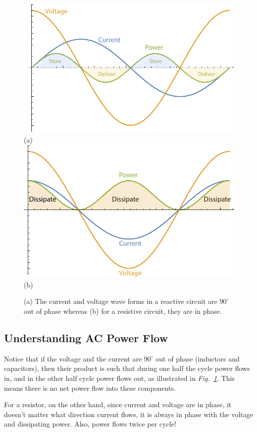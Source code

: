 \begin{figure}[t]
\centering
\includegraphics[width=.65\columnwidth]{cap_power}\\
(a)\\
\includegraphics[width=.625\columnwidth]{res_power}\\
(b)\\
\caption{(a) The current and voltage wave forms in a reactive circuit are $90^\circ$ out of phase whereas (b) for a resistive circuit, they are in phase.}
\label{fig:powerflow}
\end{figure}
\subsection{Understanding AC Power Flow}
Notice that if the voltage and the current are $90^\circ$ out of phase (inductors and capacitors), then their product is such that during one half the cycle power flows in, and in the other half cycle power flows out, as illustrated in \emph{Fig.~\ref{fig:powerflow}}.  This means there is no net power flow into these components.

For a resistor, on the other hand, since current and voltage are in phase, it doesn't matter what direction current flows, it is always in phase with the voltage and dissipating power.  Also, power flows twice per cycle!
\newpage
